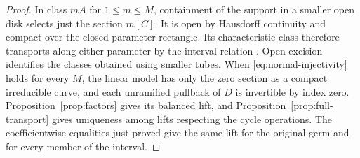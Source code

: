 \begin{proof}
In class $mA$ for $1\le m\le M$, containment of the support in a
smaller open disk selects just the section $m[C]$. It is open by Hausdorff
continuity and compact over the closed parameter rectangle. Its
characteristic class therefore transports along either parameter
by the interval relation \cite[\S2]{WueProduct}. Open excision
identifies the classes obtained using smaller tubes.
When \eqref{eq:normal-injectivity} holds for every $M$, the linear
model has only the zero section as a compact irreducible curve,
and each unramified pullback of $D$ is invertible by index zero.
Proposition~\ref{prop:factors} gives its balanced lift, and
Proposition~\ref{prop:full-transport} gives uniqueness among lifts
respecting the cycle operations. The coefficientwise equalities
just proved give the same lift for the original germ and for every
member of the interval.
\end{proof}
